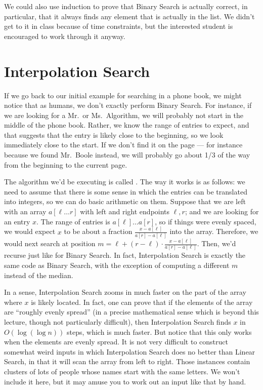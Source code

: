 We could also use induction to prove that Binary Search is actually
correct, in particular, that it always finds any element that is
actually in the list. We didn't get to it in class because of time
constraints, but the interested student is encouraged to work through
it anyway.

\section{Interpolation Search}
If we go back to our initial example for searching in a phone book, we
might notice that as humans, we don't exactly perform Binary Search.
For instance, if we are looking for a Mr.~or Ms.~Algorithm, we will
probably not start in the middle of the phone book. Rather, we know
the range of entries to expect, and that suggests that the entry is
likely close to the beginning, so we look immediately close to the
start. If we don't find it on the page --- for instance because we
found Mr.~Boole instead, we will probably go about 1/3 of the way from
the beginning to the current page.

The algorithm we'd be executing is called . 
The way it works is as follows: we need to assume that there is some
sense in which the entries can be translated into integers, so we can
do basic arithmetic on them. Suppose that we are left with an array
$a[\ell \ldots r]$ with left and right endpoints $\ell, r$; and we are
looking for an entry $x$. The range of entries is
$a[\ell] \ldots a[r]$, so if things were evenly spaced, we would
expect $x$ to be about a fraction $\frac{x-a[\ell]}{a[r]-a[\ell]}$
into the array. Therefore, we would next search at position
$m = \ell + (r-\ell) \cdot \frac{x-a[\ell]}{a[r]-a[\ell]}$.
Then, we'd recurse just like for Binary Search.
In fact, Interpolation Search is exactly the same code as Binary
Search, with the exception of computing a different $m$ instead of the
median.

In a sense, Interpolation Search zooms in much faster on the part of
the array where $x$ is likely located. In fact, one can prove that if
the elements of the array are ``roughly evenly spread'' (in a precise
mathematical sense which is beyond this lecture, though not
particularly difficult), then Interpolation Search finds $x$ in
$O(\log (\log n))$ steps, which is much faster.
But notice that this only works when the elements are evenly spread. 
It is not very difficult to construct somewhat weird inputs in which
Interpolation Search does no better than Linear Search, in that it
will scan the array from left to right. Those instances contain
clusters of lots of people whose names start with the same letters.
We won't include it here, but it may amuse you to work out an input
like that by hand.

